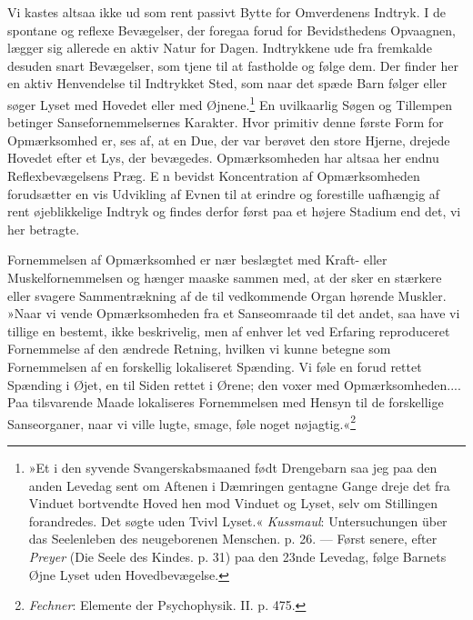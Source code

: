 \documentclass[12pt,a4paper,openany]{book}
\newcommand{\opage}[1]{\marginnote{\footnotesize\textit{[#1]}}}
\begin{document}
Vi kastes altsaa ikke ud som rent passivt Bytte for Omverdenens Indtryk.
I de spontane og reflexe Bevægelser, der foregaa forud for Bevidsthedens
Opvaagnen, lægger sig allerede en aktiv Natur for Dagen. Indtrykkene ude
fra fremkalde desuden snart Bevægelser, som tjene til at fastholde og
følge dem. Der finder her en aktiv Henvendelse til Indtrykket Sted, som
naar det spæde Barn følger eller søger Lyset med Hovedet eller med
Øjnene.\footnote[1]{»Et i den syvende Svangerskabsmaaned født Drengebarn
saa jeg paa den anden Levedag sent om Aftenen i Dæmringen gentagne Gange
dreje det fra Vinduet bortvendte Hoved hen mod Vinduet og Lyset, selv om
Stillingen forandredes. Det søgte uden Tvivl Lyset.« \emph{Kussmaul}:
Untersuchungen über das Seelenleben des neugeborenen Menschen. p. 26.
--- Først senere, efter \emph{Preyer} (Die Seele des Kindes. p. 31) paa
den 23nde Levedag, følge Barnets Øjne Lyset uden Hovedbevægelse.} En
uvilkaarlig Søgen og Tillempen betinger Sansefornemmelsernes Karakter.
Hvor primitiv denne første Form for Opmærksomhed er, ses af, at en Due,
der var berøvet den store Hjerne, drejede Hovedet efter et Lys, der
bevægedes. Opmærksomheden har altsaa her endnu Reflexbevægelsens Præg. E
n bevidst Koncentration af Opmærksomheden forudsætter en vis Udvikling
af Evnen til at erindre og forestille uafhængig af rent øjeblikkelige
Indtryk og findes derfor først paa et højere Stadium end det, vi her
betragte.

Fornemmelsen af Opmærksomhed er nær beslægtet med Kraft- eller
Muskelfornemmelsen og hænger maaske sammen
\opage{149}med, at der sker en stærkere eller svagere Sammentrækning af
de til vedkommende Organ hørende Muskler. »Naar vi vende Opmærksomheden
fra et Sanseomraade til det andet, saa have vi tillige en bestemt, ikke
beskrivelig, men af enhver let ved Erfaring reproduceret Fornemmelse af
den ændrede Retning, hvilken vi kunne betegne som Fornemmelsen af en
forskellig lokaliseret Spænding. Vi føle en forud rettet Spænding i
Øjet, en til Siden rettet i Ørene; den voxer med Opmærksomheden.... Paa
tilsvarende Maade lokaliseres Fornemmelsen med Hensyn til de forskellige
Sanseorganer, naar vi ville lugte, smage, føle noget
nøjagtig.«\footnote[1]{\emph{Fechner}: Elemente der Psychophysik. II. p.
475.}
\end{document}
